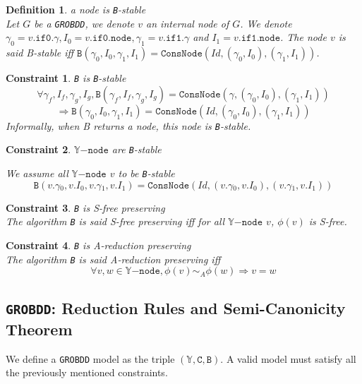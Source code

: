 \documentclass[a4paper,10pt]{article}
\newcommand{\Y}{\mathbb{Y}}
\newcommand{\Ynode}{\Y\mathtt{-node}}
\newcommand{\GroBdd}{\texttt{GROBDD}}
\newcommand{\fieldNode}{\texttt{node}}
\newcommand{\fieldGamma}{\mathtt{\gamma}}
\newcommand{\fieldThen}{\mathtt{if1}}
\newcommand{\fieldElse}{\mathtt{if0}}
\newtheorem{newdef}{Definition}
\newcommand{\definition}[2]{\begin{newdef}{#1\\}#2\end{newdef}}
\newtheorem{newcons}{Constraint}
\newcommand{\constraint}[2]{\begin{newcons}{#1\\}#2\end{newcons}}
\begin{document}
\definition{a node is \texttt{B}-stable}
{Let $G$ be a \GroBdd{}, we denote $v$ an internal node of $G$.
We denote $\gamma_0 = v.\fieldElse{}.\fieldGamma{}, I_0 = v.\fieldElse{}.\fieldNode{}, \gamma_1 = v.\fieldThen{}.\fieldGamma{}$ and $I_1 = v.\fieldThen{}.\fieldNode{}$.
The node $v$ is said B-stable iff $\mathtt{B}(\gamma_0, I_0, \gamma_1, I_1) = \mathtt{ConsNode}(Id, (\gamma_0, I_0), (\gamma_1, I_1))$.
}

\constraint{\texttt{B} is \texttt{B}-stable}
{\[\forall \gamma_f, I_f, \gamma_g, I_g, \mathtt{B}(\gamma_f, I_f, \gamma_g, I_g) = \mathtt{ConsNode}(\gamma, (\gamma_0, I_0), (\gamma_1, I_1))\]
\[\Rightarrow \mathtt{B}(\gamma_0, I_0, \gamma_1, I_1) = \mathtt{ConsNode}(Id, (\gamma_0, I_0), (\gamma_1, I_1))\]
Informally, when B returns a node, this node is \texttt{B}-stable.
}

\constraint{$\Ynode$ are \texttt{B}-stable}
{\begin{compactenum}
\item We assume all $\Ynode$ $v$ to be \texttt{B}-stable
\[\mathtt{B}(v.\fieldGamma{}_0, v.I_0, v.\fieldGamma{}_1, v.I_1) = \mathtt{ConsNode}(Id, (v.\fieldGamma{}_0, v.I_0), (v.\fieldGamma{}_1, v.I_1))\]
\end{compactenum}
}
\constraint{\texttt{B} is S-free preserving}
{The algorithm \texttt{B} is said S-free preserving iff for all $\Ynode$ $v$, $\phi(v)$ is S-free.}

\constraint{\texttt{B} is A-reduction preserving}
{The algorithm \texttt{B} is said A-reduction preserving iff
\[\forall v, w \in\Ynode, \phi(v) \sim_A \phi(w) \Rightarrow v = w\]}

\subsection{\GroBdd{}: Reduction Rules and Semi-Canonicity Theorem\label{grobdd-reduction}}
We define a \GroBdd{} model as the triple $(\Y, \mathtt{C}, \mathtt{B})$.
A valid model must satisfy all the previously mentioned constraints.
\end{document}
